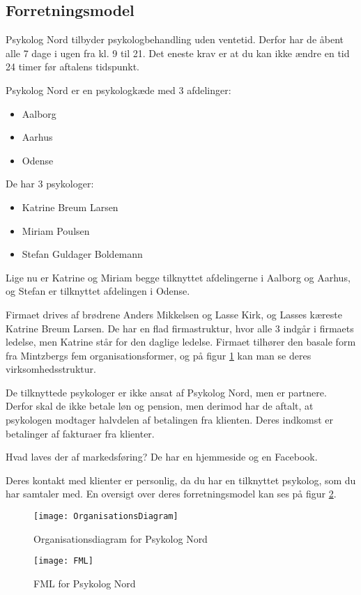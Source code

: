 \subsection{Forretningsmodel}
\label{section:forretningsmodel}

Psykolog Nord tilbyder psykologbehandling uden ventetid.
Derfor har de åbent alle 7 dage i ugen fra kl. 9 til 21. Det eneste krav er at du kan ikke ændre en tid 24 timer før aftalens tidspunkt.

Psykolog Nord er en psykologkæde med 3 afdelinger:
\begin{itemize}
    \item Aalborg
    \item Aarhus
    \item Odense
\end{itemize}

De har 3 psykologer:

\begin{itemize}
    \item Katrine Breum Larsen
    \item Miriam Poulsen
    \item Stefan Guldager Boldemann
\end{itemize}

Lige nu er Katrine og Miriam begge tilknyttet afdelingerne i Aalborg og Aarhus, og Stefan er tilknyttet afdelingen i Odense.


Firmaet drives af brødrene Anders Mikkelsen og Lasse Kirk, og Lasses kæreste Katrine Breum Larsen.
De har en flad firmastruktur, hvor alle 3 indgår i firmaets ledelse, men Katrine står for den daglige ledelse. 
Firmaet tilhører den basale form fra Mintzbergs fem organisationsformer, og på 
figur \ref{forretning:organisationsdiagram} kan man se deres virksomhedsstruktur.

De tilknyttede psykologer er ikke ansat af Psykolog Nord, men er partnere.
Derfor skal de ikke betale løn og pension, men derimod har de aftalt, at psykologen modtager halvdelen af betalingen fra klienten.
Deres indkomst er betalinger af fakturaer fra klienter.

Hvad laves der af markedsføring? De har en hjemmeside og en Facebook.

Deres kontakt med klienter er personlig, da du har en tilknyttet psykolog, som 
du har samtaler med. En oversigt over deres forretningsmodel kan ses på figur \ref{forretning:fml}.

\begin{figure}
    \caption{Organisationsdiagram for Psykolog Nord}
    \centering
        \texttt{[image: OrganisationsDiagram]}
    \label{forretning:organisationsdiagram}
\end{figure}

\begin{figure}
    \caption{FML for Psykolog Nord}
    \centering
        \texttt{[image: FML]}
    \label{forretning:fml}
\end{figure}

